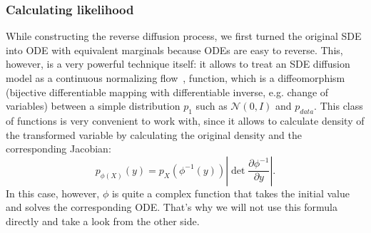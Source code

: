 \subsubsection{Calculating likelihood}
While constructing the reverse diffusion process, we first turned the original SDE into ODE with equivalent marginals because ODEs are easy to reverse. This, however, is a very powerful technique itself: it allows to treat an SDE diffusion model as a continuous normalizing flow~\cite{chen2018neural, grathwohl2018ffjord}, function, which is a diffeomorphism (bijective differentiable mapping with differentiable inverse, e.g. change of variables) between a simple distribution $p_1$ such as $\mathcal{N}(0, I)$ and $p_{data}$. This class of functions is very convenient to work with, since it allows to calculate density of the transformed variable by calculating the original density and the corresponding Jacobian:
\[
    p_{\phi(X)}(y) = p_{X}(\phi^{-1}(y))\left|\det \frac{\partial \phi^{-1}}{\partial y}\right|.
\]
In this case, however, $\phi$ is quite a complex function that takes the initial value and solves the corresponding ODE. That's why we will not use this formula directly and take a look from the other side.


